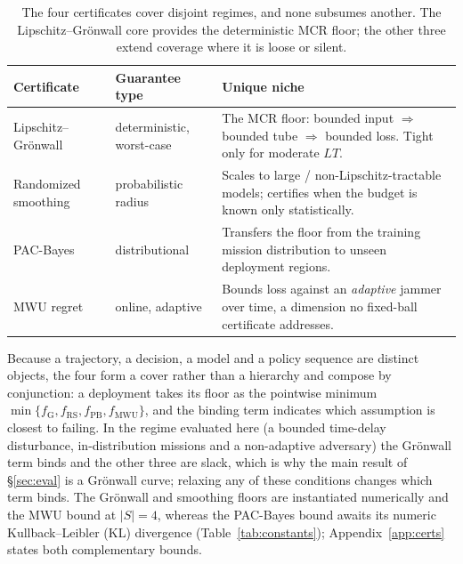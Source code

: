 \documentclass[conference,letterpaper,10pt]{IEEEtran}   %
\begin{document}
\begin{table}[t]
\centering
\caption{The four certificates cover disjoint regimes, and none subsumes
another. The Lipschitz--Gr\"onwall core provides the deterministic MCR floor;
the other three extend coverage where it is loose or silent.}
\label{tab:certs}
\footnotesize
\renewcommand{\arraystretch}{1.05}
\begin{tabularx}{\columnwidth}{@{}
  >{\hsize=0.82\hsize\raggedright\arraybackslash}X
  >{\hsize=0.70\hsize\raggedright\arraybackslash}X
  >{\hsize=1.48\hsize\raggedright\arraybackslash}X@{}}
\toprule
\textbf{Certificate} & \textbf{Guarantee type} & \textbf{Unique niche}\\
\midrule
Lipschitz--Gr\"onwall & deterministic, worst-case & The MCR floor: bounded input $\Rightarrow$ bounded tube $\Rightarrow$ bounded loss. Tight only for moderate $LT$.\\
Randomized smoothing~\cite{cohen2019smoothing} & probabilistic radius & Scales to large / non-Lipschitz-tractable models; certifies when the budget is known only statistically.\\
PAC-Bayes~\cite{viallard2021pacbayes} & distributional & Transfers the floor from the training mission distribution to unseen deployment regions.\\
MWU regret~\cite{arora2012mwu,balcan2015commitment} & online, adaptive & Bounds loss against an \emph{adaptive} jammer over time, a dimension no fixed-ball certificate addresses.\\
\bottomrule
\end{tabularx}
\end{table}

Because a trajectory, a decision, a model and a policy sequence are distinct
objects, the four form a cover rather than a hierarchy and compose by
conjunction: a deployment takes its floor as the pointwise minimum
$\min\{f_{\mathrm{G}},f_{\mathrm{RS}},f_{\mathrm{PB}},f_{\mathrm{MWU}}\}$, and
the binding term indicates which assumption is closest to failing. In the
regime evaluated here (a bounded time-delay disturbance, in-distribution
missions and a non-adaptive adversary) the Gr\"onwall term binds and the other
three are slack, which is why the main result of \S\ref{sec:eval} is a
Gr\"onwall curve; relaxing any of these conditions changes which term binds.
The Gr\"onwall and smoothing floors are instantiated numerically and the MWU
bound at $|S|=4$, whereas the PAC-Bayes bound awaits its numeric
Kullback--Leibler (KL) divergence
(Table~\ref{tab:constants}); Appendix~\ref{app:certs} states both
complementary bounds.
\end{document}
